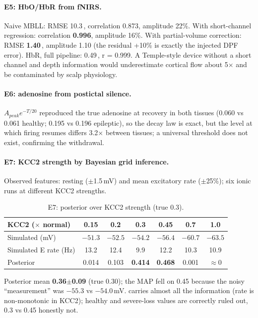 \paragraph{E5: HbO/HbR from fNIRS.} Naive MBLL: RMSE 10.3\,\uM, correlation 0.873, amplitude 22\%. With short-channel regression: correlation \textbf{0.996}, amplitude 16\%. With partial-volume correction: RMSE \textbf{1.40}\,\uM, amplitude 1.10 (the residual +10\% is exactly the injected DPF error). HbR, full pipeline: 0.49\,\uM, r = 0.999. A Temple-style device without a short channel and depth information would underestimate cortical flow about 5$\times$ and be contaminated by scalp physiology.

\paragraph{E6: adenosine from postictal silence.} $A_{peak}e^{-T/20}$ reproduced the true adenosine at recovery in both tissues (0.060 vs 0.061 healthy; 0.195 vs 0.196 epileptic), so the decay law is exact, but the level at which firing resumes differs 3.2$\times$ between tissues; a universal threshold does not exist, confirming the withdrawal.

\paragraph{E7: KCC2 strength by Bayesian grid inference.} Observed features: resting \EGABA{} ($\pm$1.5\,mV) and mean excitatory rate ($\pm$25\%); six ionic runs at different KCC2 strengths.

\begin{table}[H]
\centering\small
\caption{E7: posterior over KCC2 strength (true 0.3).}
\begin{tabular}{@{}lcccccc@{}}
\toprule
KCC2 ($\times$ normal) & 0.15 & 0.2 & \textbf{0.3} & 0.45 & 0.7 & 1.0 \\
\midrule
Simulated \EGABA{} (mV) & $-51.3$ & $-52.5$ & $-54.2$ & $-56.4$ & $-60.7$ & $-63.5$ \\
Simulated E rate (Hz) & 13.2 & 12.4 & 9.9 & 12.2 & 10.3 & 10.9 \\
Posterior & 0.014 & 0.103 & \textbf{0.414} & \textbf{0.468} & 0.001 & $\approx$0 \\
\bottomrule
\end{tabular}
\end{table}

Posterior mean \textbf{0.36$\pm$0.09} (true 0.30); the MAP fell on 0.45 because the noisy \EGABA{} ``measurement'' was $-55.3$ vs $-54.0$\,mV. \EGABA{} carries almost all the information (rate is non-monotonic in KCC2); healthy and severe-loss values are correctly ruled out, 0.3 vs 0.45 honestly not.

